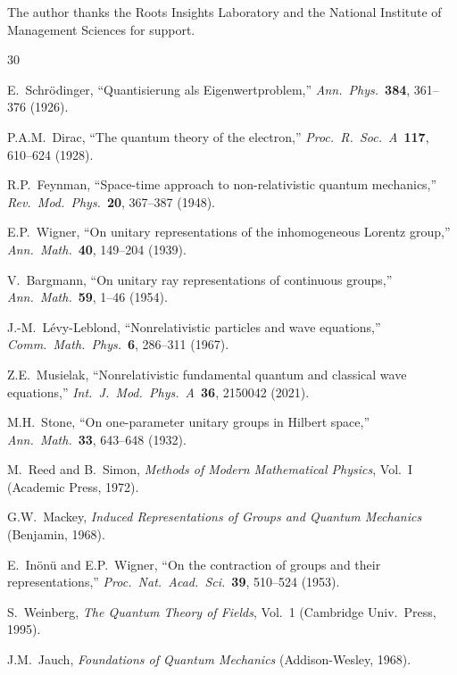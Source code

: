 \documentclass[12pt]{article}
\theoremstyle{plain}
\theoremstyle{definition}
\theoremstyle{remark}
\begin{document}
The author thanks the Roots Insights Laboratory and the National Institute of Management Sciences for support.


\begin{thebibliography}{30}

 E.~Schr\"odinger, ``Quantisierung als Eigenwertproblem,'' \emph{Ann.\ Phys.}\ \textbf{384}, 361--376 (1926).

 P.A.M.~Dirac, ``The quantum theory of the electron,'' \emph{Proc.\ R.\ Soc.\ A}\ \textbf{117}, 610--624 (1928).

 R.P.~Feynman, ``Space-time approach to non-relativistic quantum mechanics,'' \emph{Rev.\ Mod.\ Phys.}\ \textbf{20}, 367--387 (1948).

 E.P.~Wigner, ``On unitary representations of the inhomogeneous Lorentz group,'' \emph{Ann.\ Math.}\ \textbf{40}, 149--204 (1939).

 V.~Bargmann, ``On unitary ray representations of continuous groups,'' \emph{Ann.\ Math.}\ \textbf{59}, 1--46 (1954).

 J.-M.~L\'evy-Leblond, ``Nonrelativistic particles and wave equations,'' \emph{Comm.\ Math.\ Phys.}\ \textbf{6}, 286--311 (1967).

 Z.E.~Musielak, ``Nonrelativistic fundamental quantum and classical wave equations,'' \emph{Int.\ J.\ Mod.\ Phys.\ A}\ \textbf{36}, 2150042 (2021).

 M.H.~Stone, ``On one-parameter unitary groups in Hilbert space,'' \emph{Ann.\ Math.}\ \textbf{33}, 643--648 (1932).

 M.~Reed and B.~Simon, \emph{Methods of Modern Mathematical Physics}, Vol.~I (Academic Press, 1972).

 G.W.~Mackey, \emph{Induced Representations of Groups and Quantum Mechanics} (Benjamin, 1968).

 E.~In\"on\"u and E.P.~Wigner, ``On the contraction of groups and their representations,'' \emph{Proc.\ Nat.\ Acad.\ Sci.}\ \textbf{39}, 510--524 (1953).

 S.~Weinberg, \emph{The Quantum Theory of Fields}, Vol.~1 (Cambridge Univ.\ Press, 1995).

 J.M.~Jauch, \emph{Foundations of Quantum Mechanics} (Addison-Wesley, 1968).


\end{thebibliography}
\end{document}

